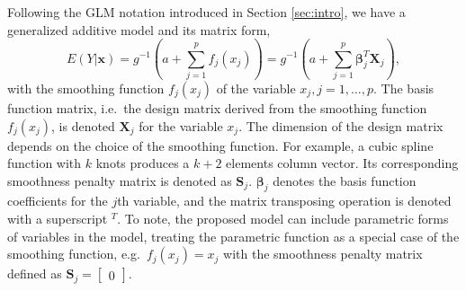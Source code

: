 \documentclass[AMA,STIX1COL,]{WileyNJD-v2}
\begin{document}
\label{sec:BHAM}

Following the GLM notation introduced in Section \ref{sec:intro}, we
have a generalized additive model and its matrix form,
\begin{equation}\label{eq:gam}
E(Y|\boldsymbol{x}) = g^{-1}(a + \sum\limits^p_{j=1}f_j(x_j)) = g^{-1}(a + \sum\limits^p_{j=1} \boldsymbol{\beta}_j^T \boldsymbol{X}_j),
\end{equation} with the smoothing function \(f_j(x_j)\) of the variable
\(x_j, j = 1, \dots, p.\) The basis function matrix, i.e.~the design
matrix derived from the smoothing function \(f_j(x_j)\), is denoted
\(\boldsymbol{X}_j\) for the variable \(x_j\). The dimension of the
design matrix depends on the choice of the smoothing function. For
example, a cubic spline function with \(k\) knots produces a \(k+2\)
elements column vector. Its corresponding smoothness penalty matrix is
denoted as \(\boldsymbol{S}_j\). \(\boldsymbol{\beta}_j\) denotes the
basis function coefficients for the \(j\)th variable, and the matrix
transposing operation is denoted with a superscript \(^T\). To note, the
proposed model can include parametric forms of variables in the model,
treating the parametric function as a special case of the smoothing
function, e.g.~\(f_j(x_j) = x_j\) with the smoothness penalty matrix
defined as \(\boldsymbol{S}_j = \begin{bmatrix}0\end{bmatrix}\).
\end{document}
